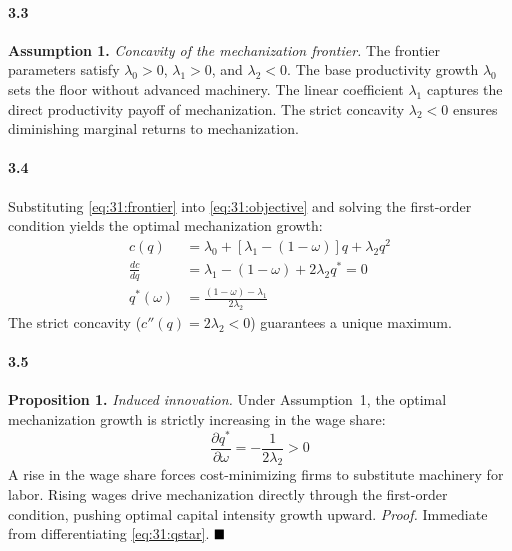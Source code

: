 \paragraph{3.3}
\textbf{Assumption 1.} \textit{Concavity of the
	mechanization frontier.} The frontier parameters satisfy
$\lambda_0 > 0$, $\lambda_1 > 0$, and $\lambda_2 < 0$. The
base productivity growth $\lambda_0$ sets the floor without
advanced machinery. The linear coefficient $\lambda_1$
captures the direct productivity payoff of mechanization. The
strict concavity $\lambda_2 < 0$ ensures diminishing marginal
returns to mechanization.

\paragraph{3.4}
Substituting \eqref{eq:31:frontier} into
\eqref{eq:31:objective} and solving the first-order condition
yields the optimal mechanization growth:
\begin{align}
	c(q) &= \lambda_0 + \left[\lambda_1 - (1-\omega)\right] q
	+ \lambda_2 q^2 \label{eq:31:unconstrained} \\
	\frac{dc}{dq} &= \lambda_1 - (1-\omega) + 2\lambda_2 q^*
	= 0 \label{eq:31:foc} \\
	q^*(\omega) &= \frac{(1-\omega) - \lambda_1}{2\lambda_2}
	\label{eq:31:qstar}
\end{align}
The strict concavity ($c''(q) = 2\lambda_2 < 0$) guarantees
a unique maximum.

\paragraph{3.5}
\textbf{Proposition 1.} \textit{Induced innovation.} Under
Assumption~1, the optimal mechanization growth is strictly
increasing in the wage share:
\begin{equation}
	\frac{\partial q^*}{\partial \omega}
	= -\frac{1}{2\lambda_2} > 0
	\label{eq:31:comparative_static}
\end{equation}
A rise in the wage share forces cost-minimizing firms to
substitute machinery for labor. Rising wages drive
mechanization directly through the first-order condition,
pushing optimal capital intensity growth upward.
\textit{Proof.} Immediate from differentiating
\eqref{eq:31:qstar}. $\hfill\blacksquare$

